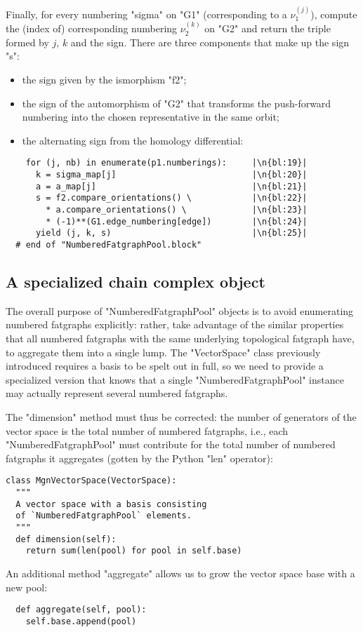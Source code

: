 Finally, for every numbering "sigma" on "G1" (corresponding to a
$\nu_1^{(j)}$), compute the (index of) corresponding numbering
$\nu_2^{(k)}$ on "G2" and return the triple formed by $j$, $k$ and the
sign.  There are three components that make up the sign "s":
\begin{itemize}
\item the sign given by the ismorphism "f2";
\item the sign of the automorphism of "G2" that transforms the
  push-forward numbering into the chosen representative in the same
  orbit;
\item the alternating sign from the homology differential:
\end{itemize}
\begin{lstlisting}
    for (j, nb) in enumerate(p1.numberings):     |\n{bl:19}|
      k = sigma_map[j]                           |\n{bl:20}|
      a = a_map[j]                               |\n{bl:21}|
      s = f2.compare_orientations() \            |\n{bl:22}|
        * a.compare_orientations() \             |\n{bl:23}|
        * (-1)**(G1.edge_numbering[edge])        |\n{bl:24}|
      yield (j, k, s)                            |\n{bl:25}|
  # end of "NumberedFatgraphPool.block"

\end{lstlisting}


\subsection{A specialized chain complex object}
\label{sec:MgnChainComplex}

The overall purpose of "NumberedFatgraphPool" objects is to avoid
enumerating numbered fatgraphs explicitly: rather, take advantage of
the similar properties that all numbered fatgraphs with the same
underlying topological fatgraph have, to aggregate them into a single
lump.   The "VectorSpace" class previously introduced requires a basis
to be spelt out in full, so we need to provide a specialized version
that knows that a single "NumberedFatgraphPool" instance may actually
represent several numbered fatgraphs.  

The "dimension" method must thus be corrected: the number of
generators of the vector space is the total number of numbered
fatgraphs, i.e., each "NumberedFatgraphPool" must contribute for the
total number of numbered fatgraphs it aggregates (gotten by the Python
"len" operator):
\begin{lstlisting}
class MgnVectorSpace(VectorSpace):
  """
  A vector space with a basis consisting
  of `NumberedFatgraphPool` elements.
  """
  def dimension(self):
    return sum(len(pool) for pool in self.base)

\end{lstlisting}
An additional method "aggregate" allows us to grow the vector space
base with a new pool:
\begin{lstlisting}
  def aggregate(self, pool):
    self.base.append(pool)
\end{lstlisting}

